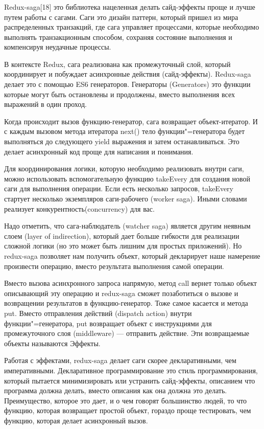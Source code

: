 \subsubsection{}

Redux-saga[18] это библиотека нацеленная делать сайд-эффекты проще и лучше путем работы с сагами.
Саги это дизайн паттерн, который пришел из мира распределенных транзакций, где сага управляет процессами, которые необходимо выполнять транзакционным способом, сохраняя состояние выполнения и компенсируя неудачные процессы.

В контексте Redux, сага реализована как промежуточный слой, который координирует и побуждает асинхронные действия (сайд-эффекты).
Redux-saga делает это с помощью ES6 генераторов.
Генераторы (Generators) это функции которые могут быть остановлены и продолжены, вместо выполнения всех выражений в один проход.

Когда происходит вызов функцию-генератор, сага возвращает объект-итератор.
И с каждым вызовом метода итератора next() тело функции"=генератора будет выполняться до следующего yield выражения и затем останавливаться.
Это делает асинхронный код проще для написания и понимания.

Для координирования логики, которую необходимо реализовать внутри саги, можно использовать вспомогательную функцию takeEvery для создания новой саги для выполнения операции.
Если есть несколько запросов, takeEvery стартует несколько экземпляров саги-рабочего (worker saga).
Иными словами реализует конкурентность(concurrency) для вас.

Надо отметить, что сага-наблюдатель (watcher saga) является другим неявным слоем (layer of indirection), который дает больше гибкости для реализации сложной логики (но это может быть лишним для простых приложений).
Но redux-saga позволяет нам получить объект, который декларирует наше намерение произвести операцию, вместо результата выполнения самой операции.

Вместо вызова асинхронного запроса напрямую, метод call вернет только объект описывающий эту операцию и redux-saga сможет позаботиться о вызове и возвращении результатов в функцию-генератор.
Тоже самое касается и метода put.
Вместо отправления действий (dispatch action) внутри функции"=генератора, put возвращает объект с инструкциями для промежуточного слоя (middleware) — отправить действие.
Эти возвращаемые объекты называются Эффекты.

Работая с эффектами, redux-saga делает саги скорее декларативными, чем императивными.
Декларативное программирование это стиль программирования, который пытается минимизировать или устранить сайд-эффекты, описанием что программа должна делать, вместо описания как она должна это делать.
Преимущество, которое это дает, и о чем говорят большинство людей, то что функцию, которая возвращает простой объект, гораздо проще тестировать, чем функцию, которая делает асинхронный вызов.
